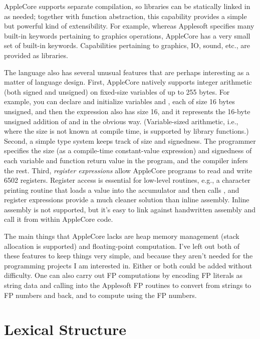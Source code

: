 \documentclass[10pt]{article}
\begin{document}
AppleCore supports separate compilation, so libraries can be
statically linked in as needed; together with function abstraction,
this capability provides a simple but powerful kind of
extensibility. For example, whereas Applesoft specifies many built-in
keywords pertaining to graphics operations, AppleCore has a very small
set of built-in keywords.  Capabilities pertaining to graphics, IO,
sound, etc., are provided as libraries.

The language also has several unusual features that are perhaps
interesting as a matter of language design.  First, AppleCore natively
supports integer arithmetic (both signed and unsigned) on fixed-size
variables of up to 255 bytes.  For example, you can declare and
initialize variables  and , each of size 16 bytes
unsigned, and then the expression  also has size 16, and it
represents the 16-byte unsigned addition of  and  in the
obvious way.  (Variable-sized arithmetic, i.e., where the size is not
known at compile time, is supported by library functions.)  Second, a
simple type system keeps track of size and signedness.  The programmer
specifies the size (as a compile-time constant-value expression) and
signedness of each variable and function return value in the program,
and the compiler infers the rest.  Third, \emph{register expressions}
allow AppleCore programs to read and write 6502 registers.  Register
access is essential for low-level routines, e.g., a character printing
routine that loads a value into the accumulator and then calls
, and register expressions provide a much cleaner
solution than inline assembly.  Inline assembly is not supported, but
it's easy to link against handwritten assembly and call it from within
AppleCore code.

The main things that AppleCore lacks are heap memory management (stack
allocation is supported) and floating-point computation.  I've left
out both of these features to keep things very simple, and because
they aren't needed for the programming projects I am interested in.
Either or both could be added without difficulty.  One can also carry
out FP computations by encoding FP literals as string data and calling
into the Applesoft FP routines to convert from strings to FP numbers
and back, and to compute using the FP numbers.

\section{Lexical Structure}
\end{document}
